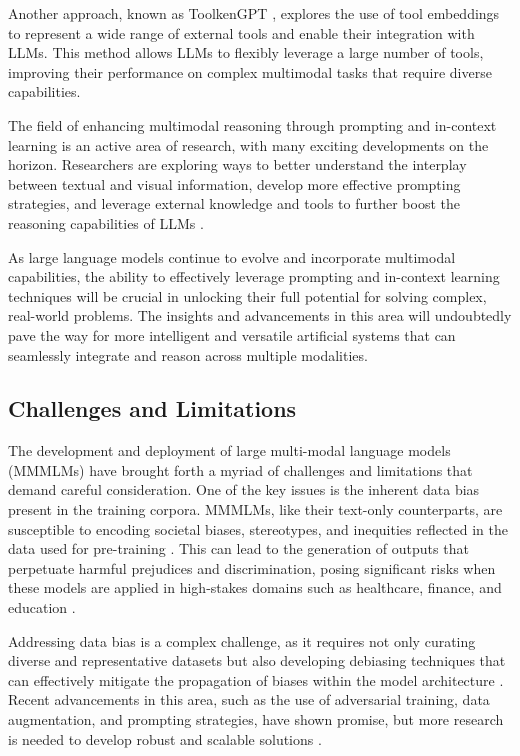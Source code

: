 \documentclass[11pt]{article}
\begin{document}
Another approach, known as ToolkenGPT \cite{ref97}, explores the use of tool embeddings to represent a wide range of external tools and enable their integration with LLMs. This method allows LLMs to flexibly leverage a large number of tools, improving their performance on complex multimodal tasks that require diverse capabilities.

The field of enhancing multimodal reasoning through prompting and in-context learning is an active area of research, with many exciting developments on the horizon. Researchers are exploring ways to better understand the interplay between textual and visual information, develop more effective prompting strategies, and leverage external knowledge and tools to further boost the reasoning capabilities of LLMs \cite{ref98,ref99}.

As large language models continue to evolve and incorporate multimodal capabilities, the ability to effectively leverage prompting and in-context learning techniques will be crucial in unlocking their full potential for solving complex, real-world problems. The insights and advancements in this area will undoubtedly pave the way for more intelligent and versatile artificial systems that can seamlessly integrate and reason across multiple modalities.

\subsection{Challenges and Limitations}

The development and deployment of large multi-modal language models (MMMLMs) have brought forth a myriad of challenges and limitations that demand careful consideration. One of the key issues is the inherent data bias present in the training corpora. MMMLMs, like their text-only counterparts, are susceptible to encoding societal biases, stereotypes, and inequities reflected in the data used for pre-training \cite{ref100}. This can lead to the generation of outputs that perpetuate harmful prejudices and discrimination, posing significant risks when these models are applied in high-stakes domains such as healthcare, finance, and education \cite{ref101}.

Addressing data bias is a complex challenge, as it requires not only curating diverse and representative datasets but also developing debiasing techniques that can effectively mitigate the propagation of biases within the model architecture \cite{ref100}. Recent advancements in this area, such as the use of adversarial training, data augmentation, and prompting strategies, have shown promise, but more research is needed to develop robust and scalable solutions \cite{ref100}.
\end{document}
